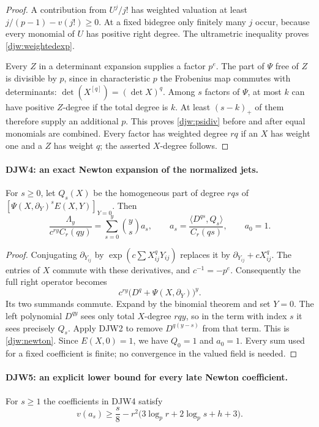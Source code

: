 \begin{proof}
A contribution from $U^j/j!$ has weighted valuation at least
$j/(p-1)-v(j!)\ge0$.  At a fixed bidegree only finitely many $j$
occur, because every monomial of $U$ has positive right degree.
The ultrametric inequality proves \eqref{djw:weightedexp}.

Every $Z$ in a determinant expansion supplies a factor $p^e$.
The part of $\Psi$ free of $Z$ is divisible by $p$, since in
characteristic $p$ the Frobenius map commutes with determinants:
$\det(X^{[q]})=(\det X)^q$.
Among $s$ factors of $\Psi$, at most $k$ can have positive
$Z$-degree if the total degree is $k$.  At least $(s-k)_+$ of
them therefore supply an additional $p$.  This proves
\eqref{djw:psidiv} before and after equal monomials are combined.
Every factor has weighted degree $rq$ if an $X$ has weight one
and a $Z$ has weight $q$; the asserted $X$-degree follows.
\end{proof}

\paragraph{DJW4: an exact Newton expansion of the normalized jets.}
\label{claim:DJW4}
For $s\ge0$, let $Q_s(X)$ be the homogeneous part of degree $rqs$
of
$[\Psi(X,\partial_Y)^sE(X,Y)]_{Y=0}$.
Then
\begin{equation}
 \frac{\Lambda_y}{c^{ry}C_r(qy)}
   =\sum_{s=0}^{y}\binom ys a_s,\qquad
 a_s=\frac{\langle D^{qs},Q_s\rangle}{C_r(qs)},\qquad a_0=1.
 \label{djw:newton}
\end{equation}

\begin{proof}
Conjugating $\partial_{Y_{ij}}$ by
$\exp(c\sum X_{ij}^qY_{ij})$ replaces it by
$\partial_{Y_{ij}}+cX_{ij}^q$.
The entries of $X$ commute with these derivatives, and
$c^{-1}=-p^e$.  Consequently the full right operator becomes
\[
 c^{ry}\bigl(D^q+\Psi(X,\partial_Y)\bigr)^y.
\]
Its two summands commute.  Expand by the binomial theorem and set
$Y=0$.  The left polynomial $D^{qy}$ sees only total $X$-degree
$rqy$, so in the term with index $s$ it sees precisely $Q_s$.
Apply DJW2 to remove $D^{q(y-s)}$ from that term.  This is
\eqref{djw:newton}.  Since $E(X,0)=1$, we have $Q_0=1$ and
$a_0=1$.  Every sum used for a fixed coefficient is finite; no
convergence in the valued field is needed.
\end{proof}

\paragraph{DJW5: an explicit lower bound for every late Newton coefficient.}
\label{claim:DJW5}
For $s\ge1$ the coefficients in DJW4 satisfy
\begin{equation}
 v(a_s)\ge
 \frac s8-r^2\bigl(3\log_p r+2\log_p s+h+3\bigr).
 \label{djw:newtonbound}
\end{equation}

